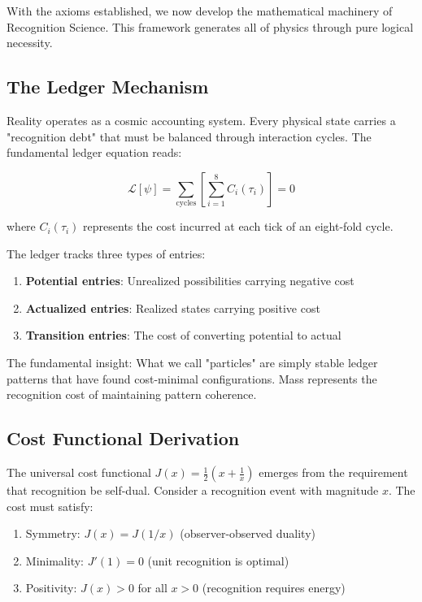 \documentclass[12pt,a4paper]{article}
\newcommand{\tick}{\tau}
\theoremstyle{definition}
\begin{document}
With the axioms established, we now develop the mathematical machinery of Recognition Science. This framework generates all of physics through pure logical necessity.

\subsection{The Ledger Mechanism}

Reality operates as a cosmic accounting system. Every physical state carries a "recognition debt" that must be balanced through interaction cycles. The fundamental ledger equation reads:

\begin{equation}
    \mathcal{L}[\psi] = \sum_{\text{cycles}} \left[ \sum_{i=1}^{8} C_i(\tick_i) \right] = 0
\end{equation}

where $C_i(\tick_i)$ represents the cost incurred at each tick of an eight-fold cycle.

The ledger tracks three types of entries:
\begin{enumerate}
    \item \textbf{Potential entries}: Unrealized possibilities carrying negative cost
    \item \textbf{Actualized entries}: Realized states carrying positive cost  
    \item \textbf{Transition entries}: The cost of converting potential to actual
\end{enumerate}

\begin{resultbox}
The fundamental insight: What we call "particles" are simply stable ledger patterns that have found cost-minimal configurations. Mass represents the recognition cost of maintaining pattern coherence.
\end{resultbox}

\subsection{Cost Functional Derivation}

The universal cost functional $J(x) = \frac{1}{2}(x + \frac{1}{x})$ emerges from the requirement that recognition be self-dual. Consider a recognition event with magnitude $x$. The cost must satisfy:

\begin{enumerate}
    \item Symmetry: $J(x) = J(1/x)$ (observer-observed duality)
    \item Minimality: $J'(1) = 0$ (unit recognition is optimal)
    \item Positivity: $J(x) > 0$ for all $x > 0$ (recognition requires energy)
\end{enumerate}
\end{document}
